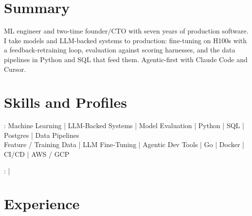 \documentclass[print]{jack-resume}
\begin{document}
\pagecolor{darkmodeBackground}


\begin{minipage}[t][1cm][t]{.03\textwidth}
    \hfill
\end{minipage}

\section{Summary}
ML engineer and two-time founder/CTO with seven years of production software. I take models and LLM-backed systems to production: fine-tuning on H100s with a feedback-retraining loop, evaluation against scoring harnesses, and the data pipelines in Python and SQL that feed them. Agentic-first with Claude Code and Cursor.
\sectionsep

\section{Skills and Profiles}
:
Machine Learning \hfill | \hfill
LLM-Backed Systems \hfill | \hfill
Model Evaluation \hfill | \hfill
Python \hfill | \hfill
SQL \hfill | \hfill
Postgres \hfill | \hfill
Data Pipelines \\
\hspace{1.0cm} Feature / Training Data \hfill | \hfill
LLM Fine-Tuning \hfill | \hfill
Agentic Dev Tools \hfill | \hfill
Go \hfill | \hfill
Docker \hfill | \hfill
CI/CD \hfill | \hfill
AWS / GCP \\

\raggedright{
    :
      \href{https://www.linkedin.com/in/jack-sturtevant/}{ \ExternalLink} |
     \href{https://github.com/jacksturt}{ \ExternalLink}}

\section{Experience}
\end{document}
